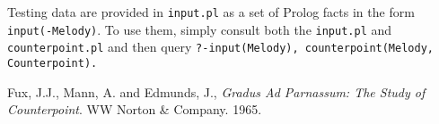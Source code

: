 \documentclass[11pt]{article} %
\begin{document}
Testing data are provided in \texttt{input.pl} as a set of Prolog facts in the form \texttt{input(-Melody)}. To use them, simply consult both the \texttt{input.pl} and \texttt{counterpoint.pl} and then query \texttt{?-input(Melody), counterpoint(Melody, Counterpoint).}


\begin{thebibliography}{9}

  {\sc Fux,} J.J., {\sc Mann,} A. and {\sc Edmunds,} J., 
  \emph{Gradus Ad Parnassum: The Study of Counterpoint}.
  WW Norton \& Company.
  1965.
  
\end{thebibliography}
\end{document}

